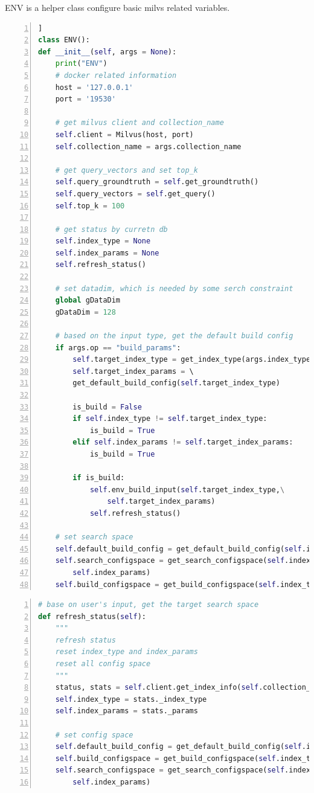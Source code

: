 \documentclass{ol-softwaremanual}
\begin{document}
ENV is a helper class configure basic milvs related variables. 
\begin{lstlisting}[language=python,numbers=left,basicstyle=\footnotesize, caption={ENV class config}] ]
class ENV():
def __init__(self, args = None):
    print("ENV")
    # docker related information
    host = '127.0.0.1' 
    port = '19530'

    # get milvus client and collection_name
    self.client = Milvus(host, port)
    self.collection_name = args.collection_name
    
    # get query_vectors and set top_k
    self.query_groundtruth = self.get_groundtruth()
    self.query_vectors = self.get_query()
    self.top_k = 100

    # get status by curretn db 
    self.index_type = None
    self.index_params = None
    self.refresh_status()

    # set datadim, which is needed by some serch constraint
    global gDataDim
    gDataDim = 128

    # based on the input type, get the default build config
    if args.op == "build_params":
        self.target_index_type = get_index_type(args.index_type)
        self.target_index_params = \ 
        get_default_build_config(self.target_index_type)

        is_build = False
        if self.index_type != self.target_index_type:
            is_build = True
        elif self.index_params != self.target_index_params:
            is_build = True
        
        if is_build:
            self.env_build_input(self.target_index_type,\
                self.target_index_params)
            self.refresh_status()

    # set search space
    self.default_build_config = get_default_build_config(self.index_type)
    self.search_configspace = get_search_configspace(self.index_type,\ 
        self.index_params)
    self.build_configspace = get_build_configspace(self.index_type)
\end{lstlisting}

\begin{lstlisting}[language=python,numbers=left,basicstyle=\footnotesize, caption={Refresh Status}]
# base on user's input, get the target search space
def refresh_status(self):
    """
    refresh status
    reset index_type and index_params
    reset all config space 
    """        
    status, stats = self.client.get_index_info(self.collection_name)
    self.index_type = stats._index_type
    self.index_params = stats._params

    # set config space
    self.default_build_config = get_default_build_config(self.index_type)
    self.build_configspace = get_build_configspace(self.index_type)
    self.search_configspace = get_search_configspace(self.index_type,\ 
        self.index_params)
\end{lstlisting}
\end{document}
